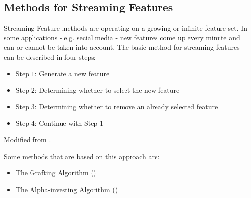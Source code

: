 \subsection{Methods for Streaming Features}
\label{sec:methods.streaming}


Streaming Feature methods are operating on a growing or infinite feature set. In
some applications - e.g. secial media - new features come up every minute and
can or cannot be taken into account. 
The basic method for streaming features can be described in four steps:

\begin{itemize}
  \item Step $1$: Generate a new feature
  \item Step $2$: Determining whether to select the new feature
  \item Step $3$: Determining whether to remove an already selected feature
  \item Step $4$: Continue with Step $1$
\end{itemize} 
Modified from \cite{Tang:14}.
 
Some methods that are based on this approach are:
\begin{itemize}
  \item The Grafting Algorithm (\cite{perkins2003online})
  \item The Alpha-investing Algorithm (\cite{zhou2005learning})
\end{itemize}